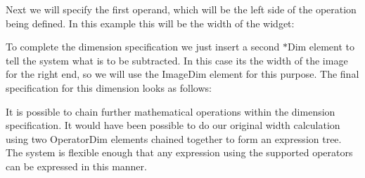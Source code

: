 Next we will specify the first operand, which will be the left side of the operation being defined. In this example this will be the width of the widget\+: 
\begin{DoxyCode}{0}
\DoxyCodeLine{}
\DoxyCodeLine{}
\end{DoxyCode}


To complete the dimension specification we just insert a second $\ast$\+Dim element to tell the system what is to be subtracted. In this case it\textquotesingle{}s the width of the image for the right end, so we will use the Image\+Dim element for this purpose. The final specification for this dimension looks as follows\+: 
\begin{DoxyCode}{0}
\DoxyCodeLine{}
\DoxyCodeLine{    />}
\DoxyCodeLine{}
\end{DoxyCode}


It is possible to chain further mathematical operations within the dimension specification. It would have been possible to do our original width calculation using two Operator\+Dim elements chained together to form an expression tree. The system is flexible enough that any expression using the supported operators can be expressed in this manner.

